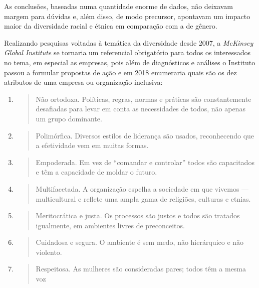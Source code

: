 As conclusões, baseadas numa quantidade enorme de dados, não deixavam
margem para dúvidas e, além disso, de modo precursor, apontavam um
impacto maior da diversidade racial e étnica em comparação com a de
gênero.

Realizando pesquisas voltadas à temática da diversidade desde 2007, a
\emph{McKinsey Global Institute} se tornaria um referencial obrigatório
para todos os interessados no tema, em especial as empresas, pois além
de diagnósticos e análises o Instituto passou a formular propostas de
ação e em 2018 enumeraria quais são os dez atributos de uma empresa ou
organização inclusiva:

\begin{enumerate}
\def\labelenumi{\arabic{enumi})}
\item
  \begin{quote}
  Não ortodoxa. Políticas, regras, normas e práticas são constantemente
  desafiadas para levar em conta as necessidades de todos, não apenas um
  grupo dominante.
  \end{quote}
\item
  \begin{quote}
  Polimórfica. Diversos estilos de liderança são usados, reconhecendo
  que a efetividade vem em muitas formas.
  \end{quote}
\item
  \begin{quote}
  Empoderada. Em vez de ``comandar e controlar'' todos são capacitados e
  têm a capacidade de moldar o futuro.
  \end{quote}
\item
  \begin{quote}
  Multifacetada. A organização espelha a sociedade em que vivemos ---
  multicultural e reflete uma ampla gama de religiões, culturas e
  etnias.
  \end{quote}
\item
  \begin{quote}
  Meritocrática e justa. Os processos são justos e todos são tratados
  igualmente, em ambientes livres de preconceitos.
  \end{quote}
\item
  \begin{quote}
  Cuidadosa e segura. O ambiente é sem medo, não hierárquico e não
  violento.
  \end{quote}
\item
  \begin{quote}
  Respeitosa. As mulheres são consideradas pares; todos têm a mesma voz

\end{quote}
\end{enumerate}

